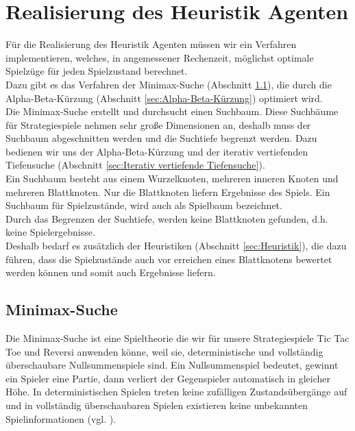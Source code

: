 \chapter{Realisierung des Heuristik Agenten}
\label{cha:Realisierung des Heuristik Agenten}

Für die Realisierung des Heuristik Agenten müssen wir ein Verfahren implementieren, welches, in angemessener Rechenzeit, möglichst optimale Spielzüge für jeden Spielzustand berechnet. \\

Dazu gibt es das Verfahren der Minimax-Suche (Abschnitt \ref{sec:Minimax}), die durch die Alpha-Beta-Kürzung (Abschnitt \ref{sec:Alpha-Beta-Kürzung}) optimiert wird. \\

Die Minimax-Suche erstellt und durchsucht einen Suchbaum.
Diese Suchbäume für Strategiespiele nehmen sehr große Dimensionen an, deshalb muss der Suchbaum abgeschnitten werden und die Suchtiefe begrenzt werden. Dazu bedienen wir uns der Alpha-Beta-Kürzung und der iterativ vertiefenden Tiefensuche (Abschnitt \ref{sec:Iterativ vertiefende Tiefensuche}). \\

Ein Suchbaum besteht aus einem Wurzelknoten, mehreren inneren Knoten und mehreren Blattknoten. Nur die Blattknoten liefern Ergebnisse des Spiels. Ein Suchbaum für Spielzustände, wird auch als Spielbaum bezeichnet. \\

Durch das Begrenzen der Suchtiefe, werden keine Blattknoten gefunden, d.h. keine Spielergebnisse.\\

Deshalb bedarf es zusätzlich der Heuristiken (Abschnitt \ref{sec:Heuristik}), die dazu führen, dass die Spielzustände auch vor erreichen eines Blattknotens bewertet werden können und somit auch Ergebnisse liefern. \\
\newpage

\section{Minimax-Suche}
\label{sec:Minimax}
Die Minimax-Suche ist eine Spieltheorie die wir für unsere Strategiespiele Tic Tac Toe und Reversi anwenden könne, weil sie, deterministische und vollständig überschaubare Nullsummenspiele sind. Ein Nullsummenspiel bedeutet, gewinnt ein Spieler eine Partie, dann verliert der Gegenspieler automatisch in gleicher Höhe. In deterministischen Spielen treten keine zufälligen Zustandsübergänge auf und in vollständig überschaubaren Spielen existieren keine unbekannten Spielinformationen (vgl. \cite[206]{Russell}). \\

